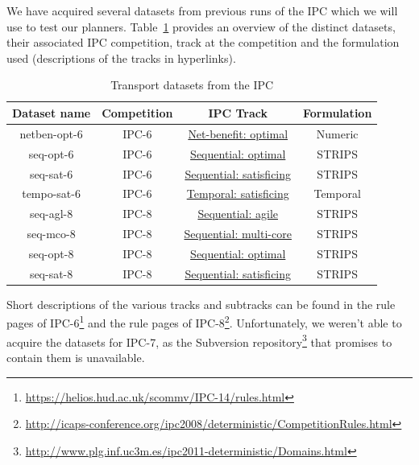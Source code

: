 We have acquired several datasets from previous runs of the IPC which we will use to test our planners.
Table~\ref{tab:ipc-datasets} provides an overview of the distinct datasets, their associated IPC competition, track at the competition and the formulation used (descriptions of the tracks in hyperlinks).

\begin{table}[htb]
\begin{tabular}{c|c|c|c}
\textbf{Dataset name} & \textbf{Competition} & \textbf{IPC Track} & \textbf{Formulation} \\ 
\hline
\hline
netben-opt-6 & IPC-6 & \href{http://icaps-conference.org/ipc2008/deterministic/NetBenefitOptimization.html}{Net-benefit: optimal} & Numeric \\ 
seq-opt-6 & IPC-6 & \href{http://icaps-conference.org/ipc2008/deterministic/SequentialOptimization.html}{Sequential: optimal} & STRIPS \\ 
seq-sat-6 & IPC-6 & \href{http://icaps-conference.org/ipc2008/deterministic/SequentialSatisficing.html}{Sequential: satisficing} & STRIPS \\ 
tempo-sat-6 & IPC-6 & \href{http://icaps-conference.org/ipc2008/deterministic/TemporalSatisficing.html}{Temporal: satisficing} & Temporal \\ 
\hline
seq-agl-8 & IPC-8 & \href{https://helios.hud.ac.uk/scommv/IPC-14/seqagi.html}{Sequential: agile} & STRIPS \\ 
seq-mco-8 & IPC-8 & \href{https://helios.hud.ac.uk/scommv/IPC-14/seqmulti.html}{Sequential: multi-core} & STRIPS \\ 
seq-opt-8 & IPC-8 & \href{https://helios.hud.ac.uk/scommv/IPC-14/seqopt.html}{Sequential: optimal} & STRIPS \\ 
seq-sat-8 & IPC-8 & \href{https://helios.hud.ac.uk/scommv/IPC-14/seqsat.html}{Sequential: satisficing} & STRIPS \\ 
\end{tabular}
\caption{Transport datasets from the IPC}
\label{tab:ipc-datasets}
\end{table}

Short descriptions of the various tracks and subtracks can be found in the rule pages of IPC-6\footnote{\url{https://helios.hud.ac.uk/scommv/IPC-14/rules.html}}
and the rule pages of IPC-8\footnote{\url{http://icaps-conference.org/ipc2008/deterministic/CompetitionRules.html}}.
Unfortunately, we weren't able to acquire the datasets for IPC-7, as the Subversion repository\footnote{\url{http://www.plg.inf.uc3m.es/ipc2011-deterministic/Domains.html}} that promises to contain them is unavailable.

